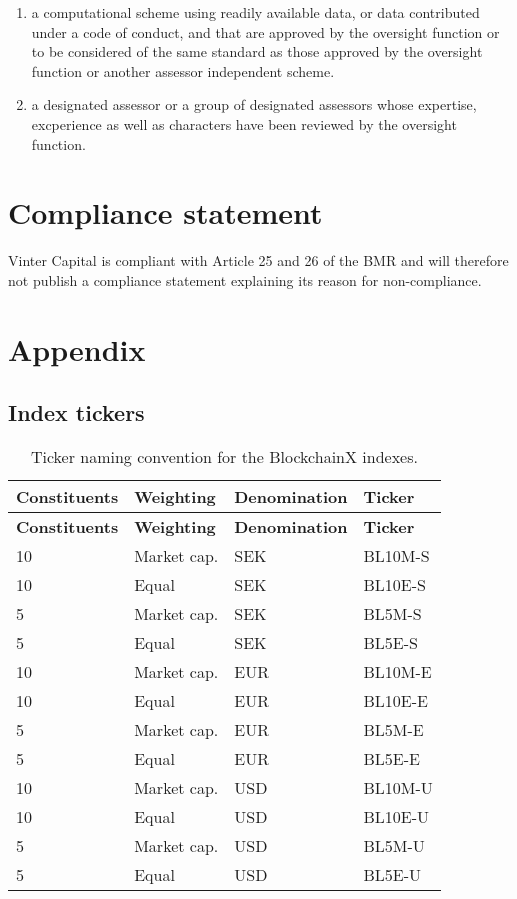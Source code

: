 \documentclass{article}
\begin{document}
\begin{enumerate}
\def\labelenumi{\arabic{enumi}.}
\item
  a computational scheme using readily available data, or data
  contributed under a code of conduct, and that are approved by the
  oversight function or to be considered of the same standard as those
  approved by the oversight function or another assessor independent
  scheme.
\item
  a designated assessor or a group of designated assessors whose
  expertise, excperience as well as characters have been reviewed by the
  oversight function.
\end{enumerate}

\section{Compliance statement}\label{compliance-statement}

Vinter Capital is compliant with Article 25 and 26 of the BMR and will
therefore not publish a compliance statement explaining its reason for
non-compliance.

\section{Appendix}\label{appendix}

\subsection{Index tickers}\label{index-tickers}

\begin{longtable}[]{@{}llll@{}}
\caption{Ticker naming convention for the BlockchainX
indexes.{}}\tabularnewline
\toprule
\textbf{Constituents} & \textbf{Weighting} & \textbf{Denomination} &
\textbf{Ticker}\tabularnewline
\midrule
\endfirsthead
\toprule
\textbf{Constituents} & \textbf{Weighting} & \textbf{Denomination} &
\textbf{Ticker}\tabularnewline
\midrule
\endhead
10 & Market cap. & SEK & BL10M-S\tabularnewline
10 & Equal & SEK & BL10E-S\tabularnewline
5 & Market cap. & SEK & BL5M-S\tabularnewline
5 & Equal & SEK & BL5E-S\tabularnewline
10 & Market cap. & EUR & BL10M-E\tabularnewline
10 & Equal & EUR & BL10E-E\tabularnewline
5 & Market cap. & EUR & BL5M-E\tabularnewline
5 & Equal & EUR & BL5E-E\tabularnewline
10 & Market cap. & USD & BL10M-U\tabularnewline
10 & Equal & USD & BL10E-U\tabularnewline
5 & Market cap. & USD & BL5M-U\tabularnewline
5 & Equal & USD & BL5E-U\tabularnewline
\bottomrule
\end{longtable}
\end{document}
